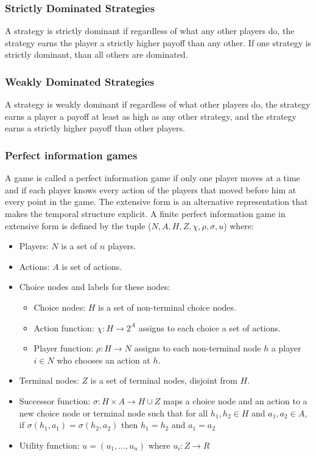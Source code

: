 \subsubsection{Strictly Dominated Strategies}
A strategy is strictly dominant if regardless of what any other players do, the strategy earns the player a strictly higher payoff than any other. If one strategy is strictly dominant, than all others are dominated.
\subsubsection{Weakly Dominated Strategies}
A strategy is weakly dominant if regardless of what other players do, the strategy earns a player a payoff at least as high as any other strategy, and the strategy earns a strictly higher payoff than other players.
\subsubsection{Perfect information games}
A game is called a perfect information game if only one player moves at a time and if each player knows every action of the players that moved before him at every point in the game.
The extensive form is an alternative representation that makes the temporal structure explicit. A finite perfect information game in extensive form is defined by the tuple ($N, A, H, Z,\chi ,\rho, \sigma, u $)
where:
\begin{itemize}
\item{Players: $N$ is a set of $n$ players.}
\item{Actions: $A$ is set of actions.}
\item{Choice nodes and labels for these nodes: }
\begin{itemize}
\item{Choice nodes: $H$ is a set of non-terminal choice nodes.}
\item{Action function: $\chi : H \to 2^A $ assigns to each choice a set of actions.}
\item{Player function: $\rho : H \to N$ assigns to each non-terminal node $h$ a player $i \in N$ who chooses an action at $h$.}
\end{itemize}
\item{Terminal nodes: $Z$ is a set of terminal nodes, disjoint from $H$.}
\item{Successor function: $\sigma : H \times A \to H \cup Z$ maps a choice node and an action to a new choice node or terminal node such that for all $h_1, h_2 \in H$ and $a_1, a_2 \in A$, if $\sigma(h_1, a_1) = \sigma(h_2, a_2)$ then $h_1  = h_2$  and $a_1 = a_2$} 
\item{Utility function: $u = (u_1,...,u_n)$ where $u_i : Z \to R$
}
\end{itemize} 
